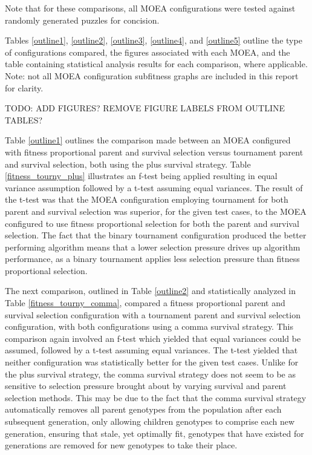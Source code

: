\documentclass[11pt]{article}
\begin{document}
Note that for these comparisons, all MOEA configurations were tested against randomly generated puzzles
for concision.

Tables \ref{outline1}, \ref{outline2}, \ref{outline3}, \ref{outline4}, and \ref{outline5}
outline the type of configurations compared, the figures associated
with each MOEA, and the table containing statistical analysis results for each comparison, where 
applicable. Note: not all MOEA configuration subfitness graphs are included in this report for
clarity.

TODO: ADD FIGURES? REMOVE FIGURE LABELS FROM OUTLINE TABLES?

Table \ref{outline1} outlines the comparison made between an MOEA configured with 
fitness proportional parent and survival selection versus tournament
parent and survival selection, both using the plus survival strategy. Table 
\ref{fitness_tourny_plus} illustrates an f-test being applied resulting in equal variance assumption
followed by a t-test assuming equal variances. The result of the t-test was that 
the MOEA configuration employing tournament for both parent and survival selection was superior, for
the given test cases, to the MOEA configured to use fitness proportional selection for both the 
parent and survival selection. The fact that the binary tournament configuration produced the better
performing algorithm means that a lower selection pressure drives up algorithm performance, as 
a binary tournament applies less selection pressure than fitness proportional selection.

The next comparison, outlined in Table \ref{outline2} and statistically analyzed in Table
\ref{fitness_tourny_comma}, compared a fitness proportional parent and survival 
selection configuration with a tournament parent and survival selection configuration, with both
configurations using a comma survival strategy. This comparison again involved an f-test which
yielded that equal variances could be assumed, followed by a t-test assuming equal variances. The
t-test yielded that neither configuration was statistically better for the given test cases. Unlike
for the plus survival strategy, the comma survival strategy does not seem to be as sensitive to
selection pressure brought about by varying survival and parent selection methods. This may be 
due to the fact that the comma survival strategy automatically removes all parent genotypes from the
population after each subsequent generation, only allowing children genotypes to comprise each
new generation, ensuring that stale, yet optimally fit, genotypes that have existed for generations
are removed for new genotypes to take their place.
\end{document}
